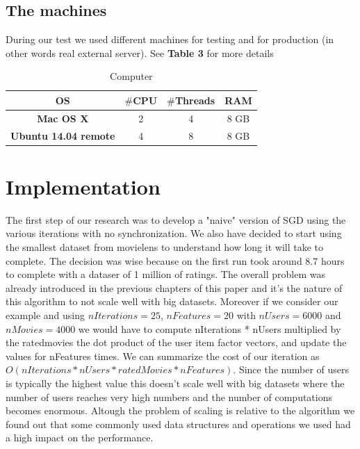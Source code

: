 \documentclass{sig-alternate-05-2015}
\begin{document}
\subsection{The machines}
During our test we used different machines for testing and for production (in other
words real external server). See \textbf{Table 3} for more details\\
\begin{table}
\centering
\caption{Computer}
\begin{tabular}{|c|c|c|c|} \hline
\textbf{OS} & \textbf{$\#$CPU} & \textbf{$\#$Threads} & \textbf{RAM}\\ \hline
\textbf{Mac OS X} & 2 & 4 & 8 GB \\ \hline
\textbf{Ubuntu 14.04 remote} & 4 & 8 & 8 GB  \\ \hline
\end{tabular}
\end{table}




\section{Implementation}
The first step of our research was to develop a "naive" version of
SGD using the various iterations with no synchronization. We also
have decided to start using the smallest dataset from movielens to understand
how long it will take to complete. The decision was wise because on the first
run took around 8.7 hours to complete with a dataser of 1 million of ratings.
The overall problem was already introduced in the previous chapters of this
paper and it's the nature of this algorithm to not scale well with big datasets.
Moreover if we consider our example and using $nIterations = 25$, $nFeatures = 20$
with $nUsers = 6000$ and $nMovies = 4000$ we would have to compute nIterations *
nUsers multiplied by the ratedmovies the dot product of the user item factor vectors, and update the values for
nFeatures times. We can summarize the cost of our iteration as $O(nIterations * nUsers * ratedMovies * nFeatures)$.
Since the number of users is typically the highest value this doesn't scale well with big datasets where the number of
users reaches very high numbers and the number of computations becomes enormous.
Altough the problem of scaling is relative to the algorithm we found out that
some commonly used data structures and operations we used had a high impact on
the performance.
\end{document}
